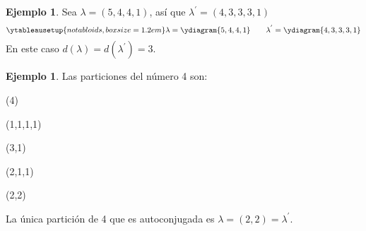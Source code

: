 \documentclass[12pt]{book}
\theoremstyle{definition}
\newtheorem{example}[theorem]{Ejemplo}
\newcounter{in}
\newcounter{ini}
\begin{document}
\begin{example}
Sea $\lambda=(5,4,4,1)$, así que $\lambda^{'}=(4,3,3,3,1)$
  \begin{equation*}
    \ytableausetup{notabloids,boxsize=1.2em} 
    \lambda=\ydiagram{5,4,4,1} \qquad
    \lambda^{'}=\ydiagram{4,3,3,3,1}
  \end{equation*}
  En este caso $d(\lambda)=d(\lambda^{'})=3$.
\end{example}

\begin{example}Las particiones del número 4 son:
  \begin{center}
    \begin{minipage}[h]{0.2\linewidth}
      \centering {}

      (4)
    \end{minipage}
    \begin{minipage}[h]{0.15\linewidth}
      \centering {}

      (1,1,1,1)
    \end{minipage}
    \begin{minipage}[h]{0.2\linewidth}
      \centering {}
      
      (3,1)
    \end{minipage}
    \begin{minipage}[h]{0.2\linewidth}
      \centering {}
      
      (2,1,1)
    \end{minipage}
    \begin{minipage}[h]{0.2\linewidth}
      \centering {}
      
      (2,2)
    \end{minipage}
  \end{center}
 La única partición de 4 que es autoconjugada es $\lambda=(2,2)=\lambda^{'}$.
\end{example}
\end{document}

